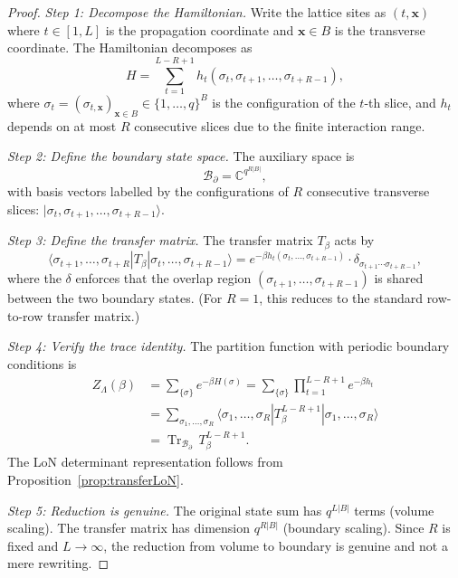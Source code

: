 \documentclass[12pt]{article}
\theoremstyle{plain}
\theoremstyle{definition}
\numberwithin{equation}{section}
\newcommand{\C}{\mathbb{C}}
\DeclareMathOperator{\Tr}{Tr}
\begin{document}
\begin{proof}
\emph{Step 1: Decompose the Hamiltonian.}
Write the lattice sites as $(t,\mathbf{x})$ where $t\in[1,L]$ is the
propagation coordinate and $\mathbf{x}\in B$ is the transverse
coordinate.  The Hamiltonian decomposes as
\begin{equation}
H = \sum_{t=1}^{L-R+1} h_t(\sigma_t,\sigma_{t+1},\ldots,\sigma_{t+R-1}),
\end{equation}
where $\sigma_t=(\sigma_{t,\mathbf{x}})_{\mathbf{x}\in B}\in\{1,\ldots,q\}^B$
is the configuration of the $t$-th slice, and $h_t$ depends on at most
$R$ consecutive slices due to the finite interaction range.

\emph{Step 2: Define the boundary state space.}
The auxiliary space is
\begin{equation}
\mathcal{B}_\partial = \C^{q^{R|B|}},
\end{equation}
with basis vectors labelled by the configurations of $R$ consecutive
transverse slices: $|\sigma_t,\sigma_{t+1},\ldots,\sigma_{t+R-1}\rangle$.

\emph{Step 3: Define the transfer matrix.}
The transfer matrix $T_\beta$ acts by
\begin{equation}
\langle\sigma_{t+1},\ldots,\sigma_{t+R}|T_\beta|\sigma_t,\ldots,\sigma_{t+R-1}\rangle
= e^{-\beta h_t(\sigma_t,\ldots,\sigma_{t+R-1})}\cdot
\delta_{\sigma_{t+1}\cdots\sigma_{t+R-1}},
\end{equation}
where the $\delta$ enforces that the overlap region
$(\sigma_{t+1},\ldots,\sigma_{t+R-1})$ is shared between the two
boundary states.  (For $R=1$, this reduces to the standard row-to-row
transfer matrix.)

\emph{Step 4: Verify the trace identity.}
The partition function with periodic boundary conditions is
\begin{align}
Z_\Lambda(\beta) &= \sum_{\{\sigma\}} e^{-\beta H(\sigma)}
= \sum_{\{\sigma\}} \prod_{t=1}^{L-R+1} e^{-\beta h_t}\\
&= \sum_{\sigma_1,\ldots,\sigma_{R}}
\langle\sigma_1,\ldots,\sigma_R|
T_\beta^{L-R+1}
|\sigma_1,\ldots,\sigma_R\rangle\\
&= \Tr_{\mathcal{B}_\partial}\,T_\beta^{L-R+1}.
\end{align}
The LoN determinant representation follows from
Proposition~\ref{prop:transferLoN}.

\emph{Step 5: Reduction is genuine.}
The original state sum has $q^{L|B|}$ terms (volume scaling).
The transfer matrix has dimension $q^{R|B|}$ (boundary scaling).
Since $R$ is fixed and $L\to\infty$, the reduction from volume to
boundary is genuine and not a mere rewriting.
\end{proof}
\end{document}
